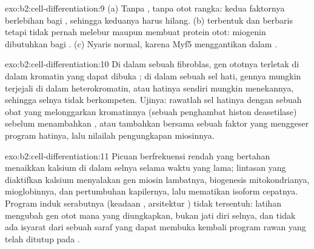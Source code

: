\begin{solution}{exo:b2:cell-differentiation:9}
(a) Tanpa , tanpa otot rangka: kedua faktornya berlebihan bagi
, sehingga keduanya harus hilang. (b) 
terbentuk dan berbaris tetapi tidak pernah melebur maupun membuat
protein otot: miogenin dibutuhkan bagi . (c) Nyaris
normal, karena Myf5 menggantikan  dalam .
\end{solution}

\begin{solution}{exo:b2:cell-differentiation:10}
Di dalam sebuah fibroblas, gen ototnya terletak di dalam kromatin yang
dapat dibuka ; di dalam sebuah sel hati, gennya mungkin terjejali
di dalam heterokromatin, atau  hatinya sendiri mungkin
menekannya, sehingga selnya tidak berkompeten. Ujinya: rawatlah sel
hatinya dengan sebuah obat yang melonggarkan kromatinnya (sebuah
penghambat histon deasetilase) sebelum menambahkan , atau
tambahkan  bersama sebuah faktor yang menggeser program hatinya,
lalu nilailah pengungkapan miosinnya.
\end{solution}

\begin{solution}{exo:b2:cell-differentiation:11}
Picuan berfrekuensi rendah yang bertahan menaikkan kalsium di dalam
selnya selama waktu yang lama; lintasan yang diaktifkan kalsium
menyalakan gen miosin lambatnya, biogenesis mitokondrianya,
mioglobinnya, dan pertumbuhan kapilernya, lalu mematikan isoform
cepatnya. Program induk serabutnya (keadaan , arsitektur
) tidak tersentuh: latihan mengubah gen otot mana yang
diungkapkan, bukan jati diri selnya, dan tidak ada isyarat dari sebuah
saraf yang dapat membuka kembali program rawan yang telah ditutup pada
.
\end{solution}

